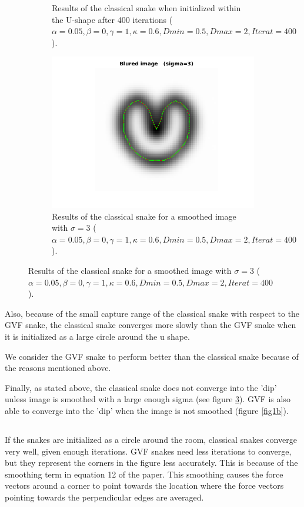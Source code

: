 \documentclass{article}
\begin{document}
\begin{figure}
\begin{subfigure}{0.49\textwidth}
  \caption{Results of the classical snake when initialized within the U-shape after 400 iterations ($\alpha=0.05, \beta=0, \gamma=1,\kappa=0.6,Dmin=0.5,Dmax=2,Iterat=400$).}
  \label{fig2b}
\end{subfigure}
\caption{Initializing the snake within the U-shape.}
\label{fig2}
\begin{subfigure}{0.49\linewidth}
  \centering
  \includegraphics[width=\linewidth]{fig3.png}
  \caption{Results of the classical snake for a smoothed image with $\sigma=3$ ($\alpha=0.05, \beta=0, \gamma=1,\kappa=0.6,Dmin=0.5,Dmax=2,Iterat=400$).}
  \label{fig3}
\end{subfigure}
\end{figure}

Also, because of the small capture range of the classical snake with respect to the GVF snake, the classical snake converges more slowly than the GVF snake when it is initialized as a large circle around the u shape. 

We consider the GVF snake to perform better than the classical snake because of the reasons mentioned above. 

Finally, as stated above, the classical snake does not converge into the 'dip' unless image is smoothed with a large enough sigma (see figure \ref{fig3}). GVF is also able to converge into the 'dip' when the image is not smoothed (figure \ref{fig1b}).



\subsection{}
If the snakes are initialized as a circle around the room, classical snakes converge very well, given enough iterations. GVF snakes need less iterations to converge, but they represent the corners in the figure less accurately. This is because of the smoothing term in equation 12 of the paper. This smoothing causes the force vectors around a corner to point towards the location where the force vectors pointing towards the perpendicular edges are averaged. 
\end{document}
